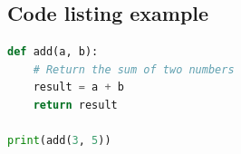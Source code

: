 \documentclass[
    12pt,
    a4paper,
]{article}
\begin{document}
\clearpage\printbibliography[heading=bibintoc]

\clearpage
\begin{appendices}


\section{Code listing example}

\begin{lstlisting}[language=Python]
def add(a, b):
    # Return the sum of two numbers
    result = a + b
    return result

print(add(3, 5))
\end{lstlisting}


\end{appendices}
\end{document}

